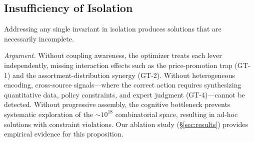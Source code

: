 \subsection{Insufficiency of Isolation}

\begin{proposition}
Addressing any single invariant in isolation produces solutions that are necessarily incomplete.
\end{proposition}

\textit{Argument.}
Without coupling awareness, the optimizer treats each lever independently, missing interaction effects such as the price-promotion trap (GT-1) and the assortment-distribution synergy (GT-2).
Without heterogeneous encoding, cross-source signals---where the correct action requires synthesizing quantitative data, policy constraints, and expert judgment (GT-4)---cannot be detected.
Without progressive assembly, the cognitive bottleneck prevents systematic exploration of the ${\sim}10^{18}$ combinatorial space, resulting in ad-hoc solutions with constraint violations.
Our ablation study (\S\ref{sec:results}) provides empirical evidence for this proposition.


